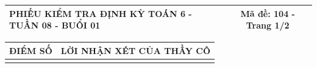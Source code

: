 \documentclass[12pt,a4paper]{article}
\begin{document}
\newpage


\noindent
\begin{tabularx}{\linewidth}{|X|c|}
\hline
\textbf{PHIẾU KIỂM TRA ĐỊNH KỲ TOÁN 6 - TUẦN 08 - BUỔI 01} & \textbf{Mã đề: 104 - Trang 1/2} \\
\hline
\end{tabularx}

\vspace{1mm}

\noindent
\begin{tabularx}{\linewidth}{|p{3.2cm}|X|}
\hline
\centering\textbf{ĐIỂM SỐ} & \centering\textbf{LỜI NHẬN XÉT CỦA THẦY CÔ} \tabularnewline
\hline
\rule{0pt}{1.8cm} & \tabularnewline
\hline
\end{tabularx}

\vspace{1.2mm}
\end{document}
